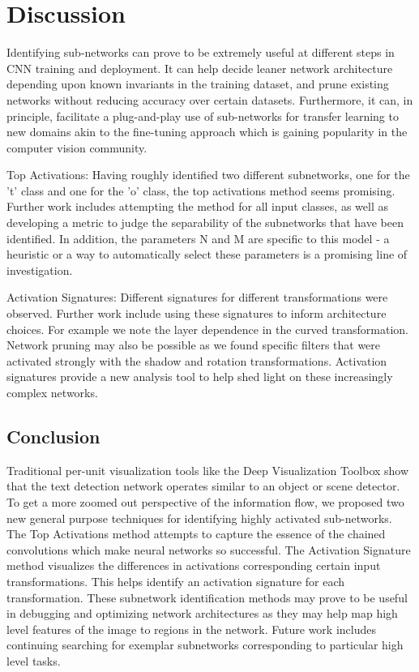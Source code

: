 \documentclass[10pt,twocolumn,letterpaper]{article}
\begin{document}
\section{Discussion}
Identifying sub-networks can prove to be extremely useful at different steps in CNN training and deployment. It can help decide leaner network architecture depending upon known invariants in the training dataset, and prune existing networks without reducing accuracy over certain datasets. Furthermore, it can, in principle, facilitate a plug-and-play use of sub-networks for transfer learning to new domains akin to the fine-tuning approach which is gaining popularity in the computer vision community.

Top Activations:
Having roughly identified two different subnetworks, one for the 't' class and one for the 'o' class, the top activations method seems promising. Further work includes attempting the method for all input classes, as well as developing a metric to judge the separability of the subnetworks that have been identified. In addition, the parameters N and M are specific to this model - a heuristic or a way to automatically select these parameters is a promising line of investigation.

Activation Signatures:
Different signatures for different transformations were observed. Further work include using these signatures to inform architecture choices. For example we note the layer dependence in the curved transformation. Network pruning may also be possible as we found specific filters that were activated strongly with the shadow and rotation transformations. Activation signatures provide a new analysis tool to help shed light on these increasingly complex networks. 



\subsection{Conclusion}
Traditional per-unit visualization tools like the Deep Visualization Toolbox \cite{yosinski2015understanding} show that the text detection network operates similar to an object or scene detector. To get a more zoomed out perspective of the information flow, we proposed two new general purpose techniques for identifying highly activated sub-networks. The Top Activations method attempts to capture the essence of the chained convolutions which make neural networks so successful. The Activation Signature method visualizes the differences in activations corresponding certain input transformations. This helps identify an activation signature for each transformation. These subnetwork identification methods may prove to be useful in debugging and optimizing network architectures as they may help map high level features of the image to regions in the network. Future work includes continuing searching for exemplar subnetworks corresponding to particular high level tasks.
\end{document}
